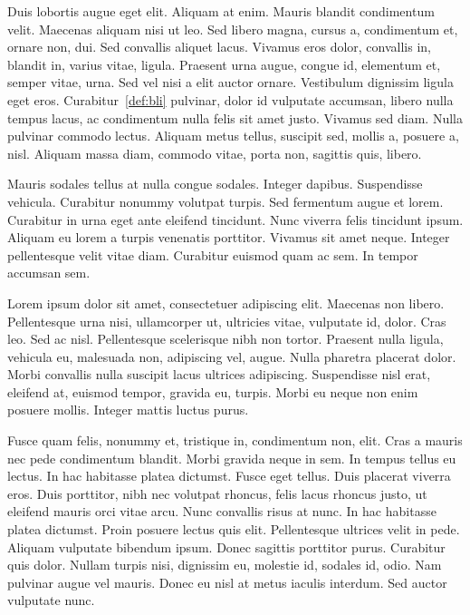 \documentclass[twoside,article,a4paper,12pt,leqno]{memoir}
\begin{document}
Duis lobortis augue eget elit. Aliquam at enim. Mauris blandit
condimentum velit. Maecenas aliquam nisi ut leo. Sed libero magna,
cursus a, condimentum et, ornare non, dui. Sed convallis aliquet
lacus. Vivamus eros dolor, convallis in, blandit in, varius vitae,
ligula. Praesent urna augue, congue id, elementum et, semper vitae,
urna. Sed vel nisi a elit auctor ornare. Vestibulum dignissim ligula
eget eros. Curabitur~\ref{def:bli} pulvinar, dolor id vulputate
accumsan, libero nulla tempus lacus, ac condimentum nulla felis sit
amet justo. Vivamus sed diam. Nulla pulvinar commodo lectus. Aliquam
metus tellus, suscipit sed, mollis a, posuere a, nisl. Aliquam massa
diam, commodo vitae, porta non, sagittis quis, libero.

Mauris sodales tellus at nulla congue sodales. Integer
dapibus. Suspendisse vehicula. Curabitur nonummy volutpat turpis. Sed
fermentum augue et lorem. Curabitur in urna eget ante eleifend
tincidunt. Nunc viverra felis tincidunt ipsum. Aliquam eu lorem a
turpis venenatis porttitor. Vivamus sit amet neque. Integer
pellentesque velit vitae diam. Curabitur euismod quam ac sem. In
tempor accumsan sem.

Lorem ipsum dolor sit amet, consectetuer adipiscing elit. Maecenas non
libero. Pellentesque urna nisi, ullamcorper ut, ultricies vitae,
vulputate id, dolor. Cras leo. Sed ac nisl. Pellentesque scelerisque
nibh non tortor. Praesent nulla ligula, vehicula eu, malesuada non,
adipiscing vel, augue. Nulla pharetra placerat dolor. Morbi convallis
nulla suscipit lacus ultrices adipiscing. Suspendisse nisl erat,
eleifend at, euismod tempor, gravida eu, turpis. Morbi eu neque non
enim posuere mollis. Integer mattis luctus purus.

Fusce quam felis, nonummy et, tristique in, condimentum non,
elit. Cras a mauris nec pede condimentum blandit. Morbi gravida neque
in sem. In tempus tellus eu lectus. In hac habitasse platea
dictumst. Fusce eget tellus. Duis placerat viverra eros. Duis
porttitor, nibh nec volutpat rhoncus, felis lacus rhoncus justo, ut
eleifend mauris orci vitae arcu. Nunc convallis risus at nunc. In hac
habitasse platea dictumst. Proin posuere lectus quis
elit. Pellentesque ultrices velit in pede. Aliquam vulputate bibendum
ipsum. Donec sagittis porttitor purus. Curabitur quis dolor. Nullam
turpis nisi, dignissim eu, molestie id, sodales id, odio. Nam pulvinar
augue vel mauris. Donec eu nisl at metus iaculis interdum. Sed auctor
vulputate nunc.
\end{document}
